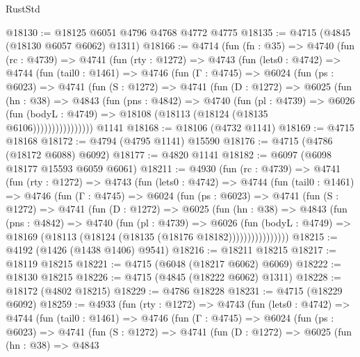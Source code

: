 \begin{lexlean}{RustStd}
\begin{coremodule}
@18130 := @18125 @6051 @4796 @4768 @4772 @4775
@18135 := @4715 (@4845 (@18130 @6057 @6062) @1311)
@18166 := @4714
    (fun (fn : @35) =>
    @4740
      (fun (rc : @4739) =>
      @4741
        (fun (rty : @1272) =>
        @4743
          (fun (lets0 : @4742) =>
          @4744
            (fun (tail0 : @1461) =>
            @4746
              (fun (Γ : @4745) =>
              @6024
                (fun (ps : @6023) =>
                @4741
                  (fun (S : @1272) =>
                  @4741
                    (fun (D : @1272) =>
                    @6025
                      (fun (hn : @38) =>
                      @4843
                        (fun (pns : @4842) =>
                        @4740
                          (fun (pl : @4739) =>
                          @6026
                            (fun (bodyL : @4749) =>
                            @18108 (@18113 (@18124 (@18135 @6106))))))))))))))))
    @1141
@18168 := @18106 (@4732 @1141)
@18169 := @4715 @18168
@18172 := @4794 (@4795 @1141) @15590
@18176 := @4715 (@4786 (@18172 @6088) @6092)
@18177 := @4820 @1141
@18182 := @6097 (@6098 @18177 @15593 @6059 @6061)
@18211 := @4930
    (fun (rc : @4739) =>
    @4741
      (fun (rty : @1272) =>
      @4743
        (fun (lets0 : @4742) =>
        @4744
          (fun (tail0 : @1461) =>
          @4746
            (fun (Γ : @4745) =>
            @6024
              (fun (ps : @6023) =>
              @4741
                (fun (S : @1272) =>
                @4741
                  (fun (D : @1272) =>
                  @6025
                    (fun (hn : @38) =>
                    @4843
                      (fun (pns : @4842) =>
                      @4740
                        (fun (pl : @4739) =>
                        @6026
                          (fun (bodyL : @4749) =>
                          @18169 (@18113 (@18124 (@18135 (@18176 @18182))))))))))))))))
@18215 := @4192 (@1426 (@1438 @1406) @9541)
@18216 := @18211 @18215
@18217 := @18119 @18215
@18221 := @4715 (@6048 (@18217 @6062) @6069)
@18222 := @18130 @18215
@18226 := @4715 (@4845 (@18222 @6062) @1311)
@18228 := @18172 (@4802 @18215)
@18229 := @4786 @18228
@18231 := @4715 (@18229 @6092)
@18259 := @4933
    (fun (rty : @1272) =>
    @4743
      (fun (lets0 : @4742) =>
      @4744
        (fun (tail0 : @1461) =>
        @4746
          (fun (Γ : @4745) =>
          @6024
            (fun (ps : @6023) =>
            @4741
              (fun (S : @1272) =>
              @4741
                (fun (D : @1272) =>
                @6025
                  (fun (hn : @38) =>
                  @4843

\end{coremodule}
\end{lexlean}

